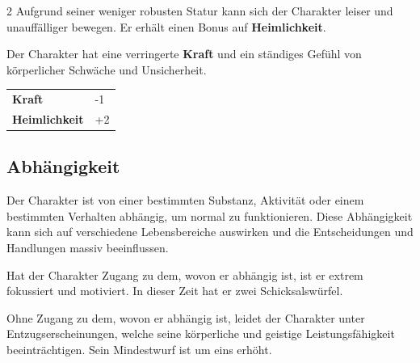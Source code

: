 \begin{multicols}{2}
    Aufgrund seiner weniger robusten Statur kann sich der Charakter leiser und unauffälliger bewegen. Er erhält einen Bonus auf \textbf{Heimlichkeit}.

    Der Charakter hat eine verringerte \textbf{Kraft} und ein ständiges Gefühl von körperlicher Schwäche und Unsicherheit.

    \begin{tabular}{@{}ll@{}}
        \textbf{Kraft} & -1\\
        \textbf{Heimlichkeit} & +2\\
    \end{tabular}

    \subsection*{Abhängigkeit}

    Der Charakter ist von einer bestimmten Substanz, Aktivität oder einem bestimmten Verhalten abhängig, um normal zu funktionieren. Diese Abhängigkeit kann sich auf verschiedene Lebensbereiche auswirken und die Entscheidungen und Handlungen massiv beeinflussen.

    Hat der Charakter Zugang zu dem, wovon er abhängig ist, ist er extrem fokussiert und motiviert. In dieser Zeit hat er zwei Schicksalswürfel.

    Ohne Zugang zu dem, wovon er abhängig ist, leidet der Charakter unter Entzugserscheinungen, welche seine körperliche und geistige Leistungsfähigkeit beeinträchtigen.  Sein Mindestwurf ist um eins erhöht.


\end{multicols}